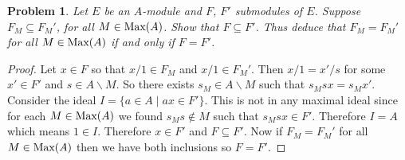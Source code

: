 \documentclass{article}
\newcommand{\Max}{\textup{Max}}
\newtheorem{problem}{Problem}
\begin{document}
\begin{problem}
Let $E$ be an $A$-module and $F$, $F'$ submodules of $E$. Suppose $F_M \subseteq F_M'$, for all $M \in \Max(A)$. Show that $F \subseteq F'$. Thus deduce that $F_M = F_M'$ for all $M \in \Max(A)$ if and only if $F = F'$.
\end{problem}
\begin{proof}
Let $x \in F$ so that $x/1 \in F_M$ and $x/1 \in F_M'$. Then $x/1 = x'/s$ for some $x' \in F'$ and $s \in A \backslash M$. So there exists $s_M \in A \backslash M$ such that $s_Msx = s_Mx'$. Consider the ideal $I = \{a \in A \mid ax \in F'\}$. This is not in any maximal ideal since for each $M \in \Max(A)$ we found $s_Ms \notin M$ such that $s_Msx \in F'$. Therefore $I = A$ which means $1 \in I$. Therefore $x \in F'$ and $F \subseteq F'$. Now if $F_M = F_M'$ for all $M \in \Max(A)$ then we have both inclusions so $F = F'$.
\end{proof}
\end{document}
